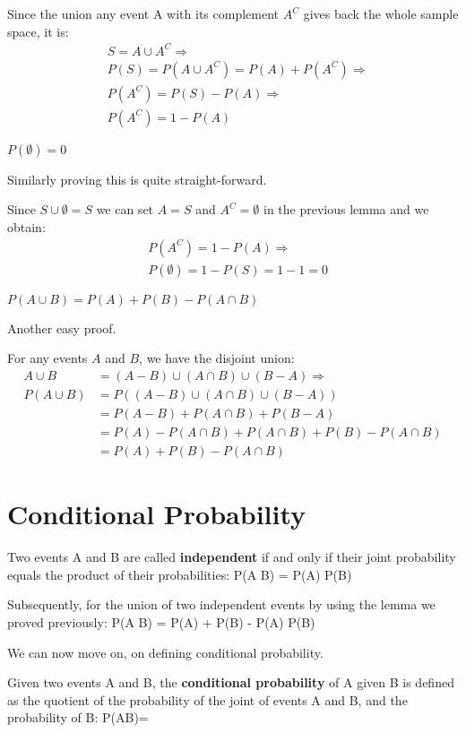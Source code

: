\bq
Since the union any event A with its complement $A^C$ gives back the whole sample space, it is:
\begin{align*}
& S = A \cup A^{C} \Rightarrow \\
& P(S) = P(A \cup A^{C}) = P(A) + P(A^{C}) \Rightarrow \\
& P(A^{C}) = P(S) - P(A) \Rightarrow \\
& P(A^{C}) = 1 - P(A)
\end{align*}
\eq

\bt[]
$P(\emptyset) = 0$
\et

Similarly proving this is quite straight-forward.

\bq
Since $S \cup \emptyset = S$ we can set $A = S$ and $A^{C} = \emptyset$ in the previous lemma and we obtain:
\begin{align*}
& P(A^{C}) = 1 - P(A) \Rightarrow \\ & P(\emptyset) = 1 - P(S) = 1 - 1 = 0
\end{align*}
\eq

\bt[]
$P(A \cup B) = P(A) + P(B) - P(A \cap B)$
\et

Another easy proof.

\bq
For any events $A$ and $B$, we have the disjoint union:
\begin{align*}
A \cup B &= (A-B) \cup (A \cap B) \cup (B-A) \Rightarrow \\
P(A \cup B) &= P((A-B) \cup (A \cap B) \cup (B-A)) \\
&= P(A - B) + P(A \cap B) + P(B - A) \\
&= P(A) - P(A \cap B) + P(A \cap B) + P(B)- P(A \cap B) \\
&= P(A) + P(B) - P(A \cap B)
\end{align*}
\eq

\section{Conditional Probability}

Two events A and B are called \textbf{independent} if and only if their joint probability equals the product of their
probabilities:
\bse
P(A \cap B) = P(A) P(B)
\ese
\ed

Subsequently, for the union of two independent events by using the lemma we proved previously:
\bse
P(A \cup B) = P(A) + P(B) - P(A) P(B)
\ese

We can now move on, on defining conditional probability.

Given two events A and B, the \textbf{conditional probability} of A given B is defined as the quotient of the
probability of the joint of events A and B, and the probability of B:
\bse
P(A\mid B)={}
\ese
\ed

